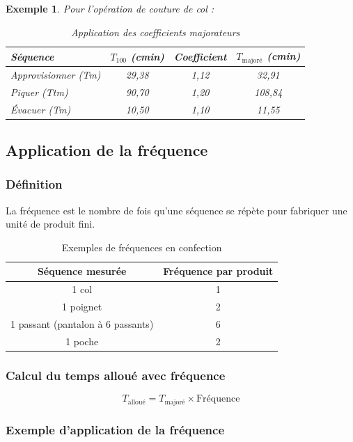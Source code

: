 \documentclass[a4paper,12pt]{article}
\newtheorem{exemple}{Exemple}[section]
\begin{document}
\begin{exemple}
Pour l'opération de couture de col :

\begin{table}[ht]
\centering
\begin{tabular}{|l|c|c|c|}
\hline
\textbf{Séquence} & $T_{100}$ (cmin) & \textbf{Coefficient} & $T_{\text{majoré}}$ (cmin) \\
\hline
Approvisionner (Tm) & 29,38 & 1,12 & 32,91 \\
Piquer (Ttm) & 90,70 & 1,20 & 108,84 \\
Évacuer (Tm) & 10,50 & 1,10 & 11,55 \\
\hline
\end{tabular}
\caption{Application des coefficients majorateurs}
\end{table}
\end{exemple}

\subsection{Application de la fréquence}

\subsubsection{Définition}

La fréquence est le nombre de fois qu'une séquence se répète pour fabriquer une unité de produit fini.

\begin{table}[ht]
\centering
\begin{tabular}{|c|c|}
\hline
\textbf{Séquence mesurée} & \textbf{Fréquence par produit} \\
\hline
1 col & 1 \\
1 poignet & 2 \\
1 passant (pantalon à 6 passants) & 6 \\
1 poche & 2 \\
\hline
\end{tabular}
\caption{Exemples de fréquences en confection}
\end{table}

\subsubsection{Calcul du temps alloué avec fréquence}

\[
T_{\text{alloué}} = T_{\text{majoré}} \times \text{Fréquence}
\]

\subsubsection{Exemple d'application de la fréquence}
\end{document}
